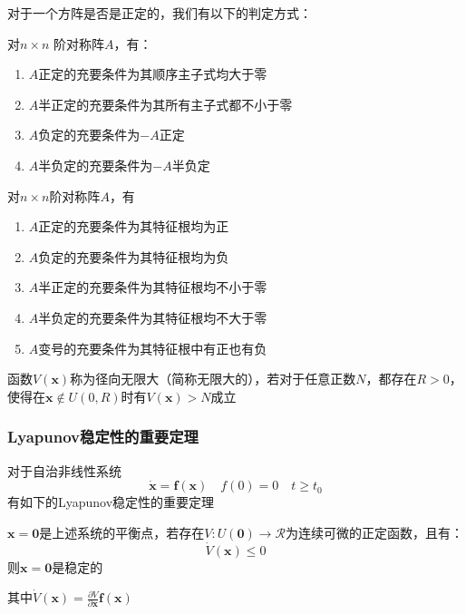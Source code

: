 对于一个方阵是否是正定的，我们有以下的判定方式：
\begin{theorem}
    对$n \times n$ 阶对称阵$A$，有：
    \begin{enumerate}
        \item $A$正定的充要条件为其顺序主子式均大于零
        \item $A$半正定的充要条件为其所有主子式都不小于零
        \item $A$负定的充要条件为$- A$正定
        \item $A$半负定的充要条件为$-A$半负定
    \end{enumerate}
\end{theorem}

\begin{theorem}
    对$n\times n$阶对称阵$A$，有
    \begin{enumerate}
        \item $A$正定的充要条件为其特征根均为正
        \item $A$负定的充要条件为其特征根均为负
        \item $A$半正定的充要条件为其特征根均不小于零
        \item $A$半负定的充要条件为其特征根均不大于零
        \item $A$变号的充要条件为其特征根中有正也有负
    \end{enumerate}
\end{theorem}

\begin{definition}[无限大性质]
    函数$V(\bm{x})$称为径向无限大（简称无限大的），若对于任意正数$N$，都存在$R>0$，使得在$\bm{x}\notin U(0,R)$时有$V(\bm{x}) > N$成立
\end{definition}

\subsubsection{Lyapunov稳定性的重要定理}

对于自治非线性系统
\begin{equation*}
    \dot{\bm{x}} = \bm{f}(\bm{x}) \quad f(0) = 0 \quad t \geq t_0
\end{equation*}
有如下的Lyapunov稳定性的重要定理

\begin{theorem}
    $\bm{x} = \bm{0}$是上述系统的平衡点，若存在$V:U(\bm{0}) \rightarrow \mathcal{R}$为连续可微的正定函数，且有：
    \begin{equation*}
        \dot{V}(\bm{x}) \leq 0
    \end{equation*}
    则$\bm{x} = \bm{0}$是稳定的

    其中$\dot{V}(\bm{x}) = \frac{\partial V}{\partial \bm{x}}  \bm{f}(\bm{x})$
\end{theorem}


